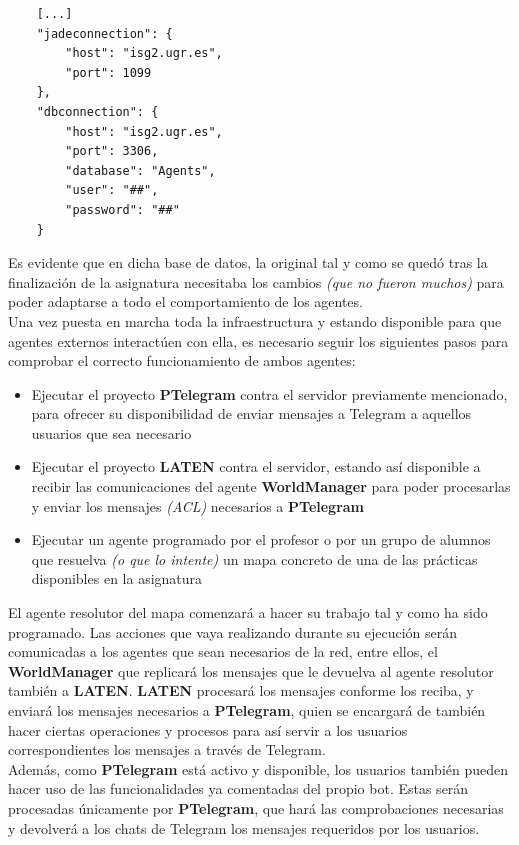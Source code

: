 \begin{lstlisting}
    [...]
    "jadeconnection": {
        "host": "isg2.ugr.es",
        "port": 1099
    },
    "dbconnection": {
        "host": "isg2.ugr.es",
        "port": 3306,
        "database": "Agents",
        "user": "##",
        "password": "##"
    }
\end{lstlisting}

Es evidente que en dicha base de datos, la original tal y como se quedó tras la finalización de la asignatura necesitaba los cambios \textit{(que no fueron muchos)} para poder adaptarse a todo el comportamiento de los agentes.\\

Una vez puesta en marcha toda la infraestructura y estando disponible para que agentes externos interactúen con ella, es necesario seguir los siguientes pasos para comprobar el correcto funcionamiento de ambos agentes:\\

\begin{itemize}
	\item Ejecutar el proyecto \textbf{PTelegram} contra el servidor previamente mencionado, para ofrecer su disponibilidad de enviar mensajes a Telegram a aquellos usuarios que sea necesario
	\item Ejecutar el proyecto \textbf{LATEN} contra el servidor, estando así disponible a recibir las comunicaciones del agente \textbf{WorldManager} para poder procesarlas y enviar los mensajes \textit{(ACL)} necesarios a \textbf{PTelegram} 
	\item Ejecutar un agente programado por el profesor o por un grupo de alumnos que resuelva \textit{(o que lo intente)} un mapa concreto de una de las prácticas disponibles en la asignatura
\end{itemize}

El agente resolutor del mapa comenzará a hacer su trabajo tal y como ha sido programado. Las acciones que vaya realizando durante su ejecución serán comunicadas a los agentes que sean necesarios de la red, entre ellos, el \textbf{WorldManager} que replicará los mensajes que le devuelva al agente resolutor también a \textbf{LATEN}. \textbf{LATEN} procesará los mensajes conforme los reciba, y enviará los mensajes necesarios a \textbf{PTelegram}, quien se encargará de también hacer ciertas operaciones y procesos para así servir a los usuarios correspondientes los mensajes a través de Telegram.\\

Además, como \textbf{PTelegram} está activo y disponible, los usuarios también pueden hacer uso de las funcionalidades ya comentadas del propio bot. Estas serán procesadas únicamente por \textbf{PTelegram}, que hará las comprobaciones necesarias y devolverá a los chats de Telegram los mensajes requeridos por los usuarios.\\

